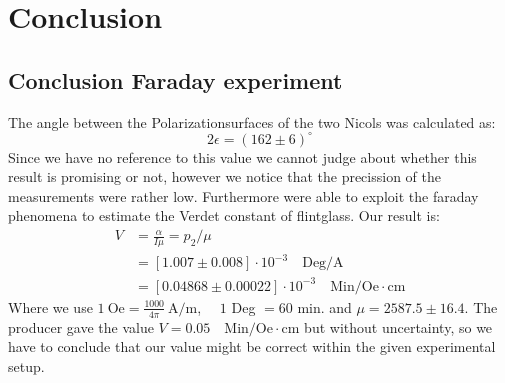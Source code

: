 \section{Conclusion}
\subsection{Conclusion Faraday experiment}
The angle between the Polarizationsurfaces of the two Nicols was calculated as:\\
\begin{equation*}
2\epsilon = (162\pm 6) ^{\circ} 
\end{equation*}
Since we have no reference to this value we cannot judge about whether this result is promising
or not, however we notice that the precission of the measurements were rather low.
Furthermore were able to exploit the
faraday phenomena to estimate the Verdet constant of flintglass.
Our result is:
\begin{align*}
    V &= \frac{\alpha}{I\mu}   = p_2 / \mu \\
      &= \left [ 1.007 \pm 0.008 \right ]\cdot 10^{-3} \quad \mathrm{Deg/A} \\
      &= \left [ 0.04868 \pm 0.00022 \right ] \cdot 10^{-3} \quad \mathrm{Min/Oe\cdot cm}
\end{align*}
Where we use $1\ \mathrm{Oe} = \frac{1000}{4\pi}\ \mathrm{A/m}$, $\quad1$ Deg $=60$ min. and $\mu = 2587.5\pm16.4$.
The producer gave the value $V = 0.05 \quad \mathrm{Min/Oe \cdot cm}$ but without uncertainty, so
we have to conclude that our value might be correct within the given experimental setup. 
